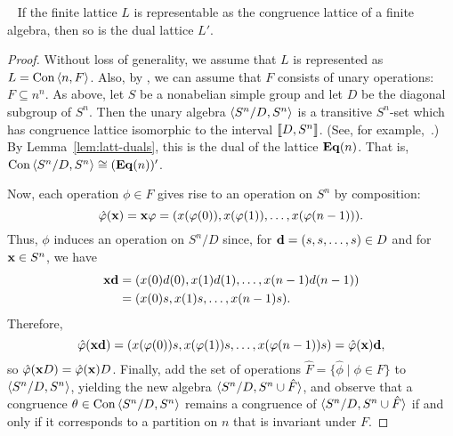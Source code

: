 \begin{theorem}\
  \label{thm:duals-interv-subl}
  If the finite lattice $L$ is representable as the congruence lattice of a
  finite algebra, then so is the dual lattice $L'$.
\end{theorem}
\begin{proof}
  Without loss of generality, we assume that $L$ is represented
  as $L = \operatorname{Con\,} \langle n, F\rangle$.
  Also, by \cite[Theorem~4.18]{alvi:1987}, we can assume
  that $F$ consists of unary operations: $F \subseteq n^n$.  
  As above, let $S$ be a nonabelian simple group
  and let $D$ be the diagonal subgroup of $S^n$.
  Then the unary algebra $\langle S^n/D, S^n\rangle$  is a transitive $S^n$-set which
  has congruence lattice isomorphic to the interval $\llbracket D, S^n\rrbracket$.
  (See, for example,~\cite[Lemma~4.20]{alvi:1987}.)
  By Lemma~\ref{lem:latt-duals}, this is the dual
  of the lattice $\mathbf{Eq}(n)$.  That is, 
  $\operatorname{Con\,} \langle S^n/D, S^n\rangle \cong (\mathbf{Eq}(n))'$.
  
  Now, each operation $\phi \in F$ gives rise to an operation on $S^n$
  by composition:
  \[
  \hat{\phi}(\bx) =  \bx \phi = %
  (x(\phi(0)), x(\phi(1)),\dots, x(\phi(n-1))). 
  \]
  Thus, $\phi$ induces an operation on $S^n/D$ since, for 
  $\mathbf{d} = (s, s, \dots, s) \in D$ and for $\mathbf{x} \in S^n$, we have
  \begin{align*}
  \mathbf{x} \mathbf{d} &= (x(0)d(0), x(1)d(1), \dots , x(n-1)d(n-1))\\
  &= (x(0)s, x(1)s, \dots , x(n-1)s).
  \end{align*}
  Therefore,
  \[\hat{\varphi}(\mathbf{x} \mathbf{d}) =(x (\varphi(0)) s, x(\varphi(1))s, \dots , x(\varphi(n-1))s)=
  \hat{\varphi}(\mathbf{x}) \mathbf{d},\]
  so $\hat{\varphi}(\mathbf{x} D)  = \hat{\varphi}(\mathbf{x}) D$.  Finally, add the set of operations 
  $\hat{F} = \{\hat{\phi} \mid \phi \in F\}$ to $\langle S^n/D, S^n\rangle$, yielding the
  new algebra  $\langle S^n/D, S^n \cup \hat{F}\rangle$, and observe
  that a congruence $\theta \in \operatorname{Con\,}\langle S^n/D, S^n\rangle$ remains a congruence of
  $\langle S^n/D, S^n \cup \hat{F}\rangle$ if and only if it corresponds to a partition on
  $n$ that is invariant under $F$.
\end{proof}


